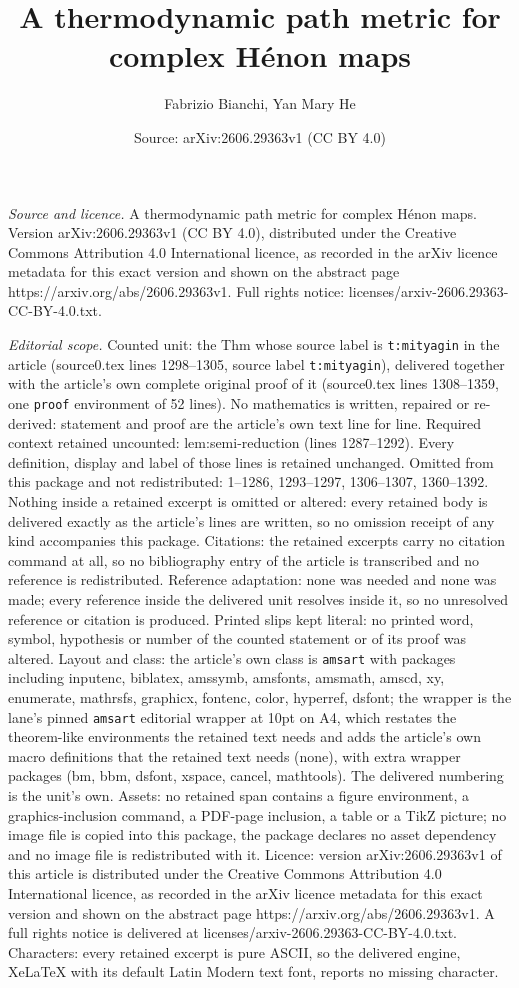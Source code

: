 \documentclass[10pt,a4paper]{amsart}
\title[A thermodynamic path metric for complex H\'enon maps]{A thermodynamic path metric for complex H\'enon maps}
\author{Fabrizio Bianchi, Yan Mary He}
\date{Source: arXiv:2606.29363v1 (CC BY 4.0)}
\begin{document}
\maketitle

\noindent\emph{Source and licence.} A thermodynamic path metric for complex H\'enon maps. Version arXiv:2606.29363v1 (CC BY 4.0), distributed under the Creative Commons Attribution 4.0 International licence, as recorded in the arXiv licence metadata for this exact version and shown on the abstract page https://arxiv.org/abs/2606.29363v1. Full rights notice: licenses/arxiv-2606.29363-CC-BY-4.0.txt.\par\smallskip

\noindent\textit{Editorial scope.} Counted unit: the Thm whose source label is \texttt{t:mityagin} in the article (source0.tex lines 1298--1305, source label \texttt{t:mityagin}), delivered together with the article's own complete original proof of it (source0.tex lines 1308--1359, one \texttt{proof} environment of 52 lines). No mathematics is written, repaired or re-derived: statement and proof are the article's own text line for line. Required context retained uncounted: lem:semi-reduction (lines 1287--1292). Every definition, display and label of those lines is retained unchanged. Omitted from this package and not redistributed: 1--1286, 1293--1297, 1306--1307, 1360--1392. Nothing inside a retained excerpt is omitted or altered: every retained body is delivered exactly as the article's lines are written, so no omission receipt of any kind accompanies this package. Citations: the retained excerpts carry no citation command at all, so no bibliography entry of the article is transcribed and no reference is redistributed. Reference adaptation: none was needed and none was made; every reference inside the delivered unit resolves inside it, so no unresolved reference or citation is produced. Printed slips kept literal: no printed word, symbol, hypothesis or number of the counted statement or of its proof was altered. Layout and class: the article's own class is \texttt{amsart} with packages including inputenc, biblatex, amssymb, amsfonts, amsmath, amscd, xy, enumerate, mathrsfs, graphicx, fontenc, color, hyperref, dsfont; the wrapper is the lane's pinned \texttt{amsart} editorial wrapper at 10pt on A4, which restates the theorem-like environments the retained text needs and adds the article's own macro definitions that the retained text needs (none), with extra wrapper packages (bm, bbm, dsfont, xspace, cancel, mathtools). The delivered numbering is the unit's own. Assets: no retained span contains a figure environment, a graphics-inclusion command, a PDF-page inclusion, a table or a TikZ picture; no image file is copied into this package, the package declares no asset dependency and no image file is redistributed with it. Licence: version arXiv:2606.29363v1 of this article is distributed under the Creative Commons Attribution 4.0 International licence, as recorded in the arXiv licence metadata for this exact version and shown on the abstract page https://arxiv.org/abs/2606.29363v1. A full rights notice is delivered at licenses/arxiv-2606.29363-CC-BY-4.0.txt. Characters: every retained excerpt is pure ASCII, so the delivered engine, XeLaTeX with its default Latin Modern text font, reports no missing character.
\end{document}

